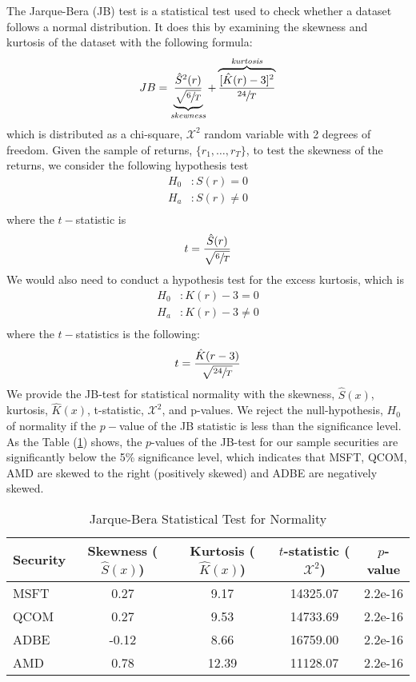 \documentclass[12pt]{article}
\begin{document}
The Jarque-Bera (JB) test is a statistical test used to check whether a dataset follows a normal distribution. It does this by examining the skewness and kurtosis of the dataset with the following formula:
\begin{equation}
	JB= \underbrace{\frac{\hat{S}^2(r)}{\sqrt{\sfrac{6}{T}}}}_{\textit{skewness}}  +\overbrace{\frac{[\hat{K}(r)-3]^2}{\sfrac{24}{T}}}^{\textit{kurtosis}}
\end{equation}
which is distributed as a chi-square, $\mathcal{X}^2$ random variable with 2 degrees of freedom. Given the sample of returns, $\lbrace r_1,\ldots,r_T\rbrace$, to test the skewness of the returns, we consider the following hypothesis test
\[
\begin{aligned}
	H_0&:S(r)= 0\\
	H_a&:S(r)\neq 0\\
\end{aligned}
\]
where the $t-$statistic is 
\begin{equation}
	t=\frac{\hat{S}(r)}{\sqrt{\sfrac{6}{T}}}
\end{equation}
We would also need to conduct a hypothesis test for the excess kurtosis, which is
\[
\begin{aligned}
	H_0&:K(r)-3= 0\\
	H_a&:K(r)-3\neq 0\\
\end{aligned}
\]
where the $t-$statistics is the following:
\begin{equation}
	t=\frac{\hat{K}(r-3)}{\sqrt{\sfrac{24}{T}}}
\end{equation}
We provide the JB-test for statistical normality with the skewness, $\hat{S}(x)$, kurtosis, $\hat{K}(x)$, t-statistic, $\mathcal{X}^2$, and p-values. We reject the null-hypothesis, $H_0$ of normality if the $p-$value of the JB statistic is less than the significance level. As the Table (\ref*{tab:jbtest}) shows, the $p$-values of the JB-test for our sample securities are significantly below the 5\% significance level, which indicates that MSFT, QCOM, AMD are skewed to the right (positively skewed) and ADBE are negatively skewed.
\begin{table}[ht]
	\centering
	\caption{Jarque-Bera Statistical Test for Normality}
	\begin{tabular}[t]{lcccc}
		\toprule
		Security & Skewness ($\hat{S}(x)$) & Kurtosis ($\hat{K}(x)$) & $t$-statistic ($\mathcal{X}^2$) & $p$-value \\
		\midrule
		MSFT &  0.27 & 9.17  & 14325.07 & 2.2e-16  \\
		QCOM &  0.27 & 9.53  & 14733.69 & 2.2e-16 \\
		ADBE & -0.12 & 8.66  & 16759.00 & 2.2e-16 \\	   
		AMD  &  0.78 & 12.39 & 11128.07 & 2.2e-16 \\				   
		\bottomrule
	\end{tabular}\label{tab:jbtest}
\end{table}
\end{document}
